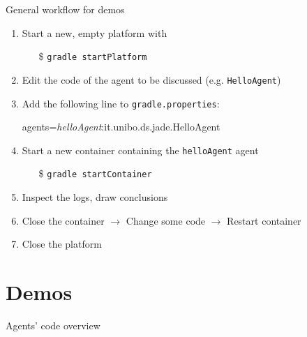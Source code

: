 \documentclass{beamer}\mode<presentation>{\usetheme{AMSCesenaPurpleAndGold}}
\begin{document}
\begin{frame}{General workflow for demos}
	
	\begin{enumerate}
		\item Start a new, empty platform with 
		\begin{itemize}
			\item[\$] \texttt{gradle startPlatform}
		\end{itemize}
		
		\vfill
		
		\item Edit the code of the agent to be discussed (e.g. \texttt{HelloAgent})
		
		\vfill
		
		\item Add the following line to \texttt{gradle.properties}:
		\begin{center}\ttfamily
			\alert{agents}=\textit{helloAgent}:it.unibo.ds.jade.HelloAgent
		\end{center}
	
		\vfill
		
		\item Start a new container containing the \texttt{helloAgent} agent
		\begin{itemize}
			\item[\$] \texttt{gradle startContainer}
		\end{itemize}
	
		\vfill
		
		\item Inspect the logs, draw conclusions
		
		\vfill
		
		\item Close the container $\rightarrow$ Change some code $\rightarrow$ Restart container
		
		\vfill
		
		\item Close the platform	
		
	\end{enumerate}

 \end{frame}

\section{Demos}

\begin{frame}{Agents' code overview}
	
\end{frame}
\end{document}

